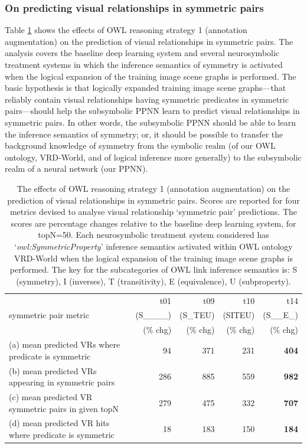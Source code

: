 \documentclass[]{jair}
\begin{document}
\subsubsection{On predicting visual relationships in symmetric pairs}

Table \ref{table:symmetric-pairs-in-pred-vrs} shows the effects of OWL reasoning strategy 1 (annotation augmentation) on the prediction of visual relationships in symmetric pairs.
The analysis covers the baseline deep learning system and several neurosymbolic treatment systems in which the inference semantics of symmetry is activated when the logical expansion of the training image scene graphs is performed. 
The basic hypothesis is that logically expanded training image scene graphs---that reliably contain visual relationships having symmetric predicates in symmetric pairs---should help the subsymbolic PPNN learn to predict visual relationships in symmetric pairs.
In other words, the subsymbolic PPNN should be able to learn the inference semantics of symmetry; or, it should be possible to transfer the background knowledge of symmetry from the symbolic realm (of our OWL ontology, VRD-World, and of logical inference more generally) to the subsymbolic realm of a neural network (our PPNN).

\begin{table}[t]
  \centering
  \footnotesize
  \begin{threeparttable}
  \caption{\footnotesize The effects of OWL reasoning strategy 1 (annotation augmentation) on the prediction of visual relationships in symmetric pairs. Scores are reported for four metrics devised to analyse visual relationship `symmetric pair' predictions. The scores are percentage changes relative to the baseline deep learning system, for topN=50. Each neurosymbolic treatment system considered has `\emph{owl:SymmetricProperty}' inference semantics activated within OWL ontology VRD-World when the logical expansion of the training image scene graphs is performed. The key for the subcategories of OWL link inference semantics is: S (symmetry), I (inverses),  T (transitivity),  E (equivalence),  U (subproperty).}
  \label{table:symmetric-pairs-in-pred-vrs}
  \begin{tabular}{lrrrr}
    \toprule 
             & t01 & t09 & t10 & t14 \\
     symmetric pair metric  & (S\_\_\_\_) & (S\_TEU) & (SITEU) & (S\_\_E\_) \\
             & (\% chg) & (\% chg) & (\% chg) & (\% chg) \\
    \midrule
    (a) mean predicted VRs where predicate is symmetric & 94 & 371 & 231 & \textbf{404} \\
    (b) mean predicted VRs appearing in symmetric pairs & 286 & 885 & 559 & \textbf{982} \\
    (c) mean predicted VR symmetric pairs in given topN & 279 & 475 & 332 & \textbf{707} \\
    (d) mean predicted VR hits where predicate is symmetric & 18 & 183 & 150 & \textbf{184} \\
    \bottomrule
  \end{tabular}
  \end{threeparttable}
\end{table}
\end{document}
